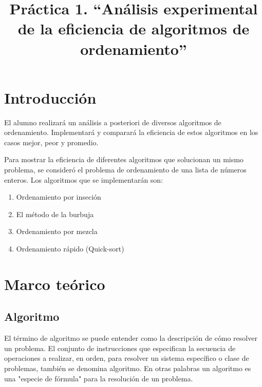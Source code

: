 \documentclass[conference]{IEEEtran}
\begin{document}
%
\title{Pr\'actica 1. ``An\'alisis experimental de la eficiencia de algoritmos de ordenamiento''}


\author{

}
\maketitle



\section{Introducci\'on}
El alumno realizar\'a un an\'alisis a posteriori de diversos algoritmos de ordenamiento. Implementar\'a y comparar\'a la eficiencia de estos algoritmos en los casos mejor, peor y promedio.

Para mostrar la eficiencia de diferentes algoritmos que solucionan un mismo problema, se consider\'o el problema de ordenamiento de una lista de n\'umeros enteros. Los algoritmos que se implementar\'an son:

\begin{enumerate}
	\item Ordenamiento por inseci\'on
	\item El m\'etodo de la burbuja 
	\item Ordenamiento por mezcla
	\item Ordenamiento r\'apido (Quick-sort)
\end{enumerate}

\section{Marco teórico}

\subsection{Algoritmo}

El término de algoritmo se puede entender como la descripción de cómo resolver un problema. El conjunto de instrucciones que especifican la secuencia de operaciones a realizar, en orden, para resolver un sistema específico o clase de problemas, también se denomina algoritmo. En otras palabras un algoritmo es una "especie de fórmula" para la resolución de un problema.
\end{document}
